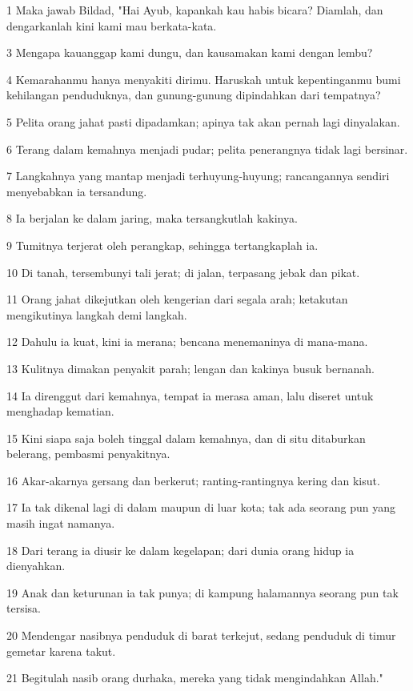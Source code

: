 \par 1 Maka jawab Bildad, "Hai Ayub, kapankah kau habis bicara? Diamlah, dan dengarkanlah kini kami mau berkata-kata.
\par 3 Mengapa kauanggap kami dungu, dan kausamakan kami dengan lembu?
\par 4 Kemarahanmu hanya menyakiti dirimu. Haruskah untuk kepentinganmu bumi kehilangan penduduknya, dan gunung-gunung dipindahkan dari tempatnya?
\par 5 Pelita orang jahat pasti dipadamkan; apinya tak akan pernah lagi dinyalakan.
\par 6 Terang dalam kemahnya menjadi pudar; pelita penerangnya tidak lagi bersinar.
\par 7 Langkahnya yang mantap menjadi terhuyung-huyung; rancangannya sendiri menyebabkan ia tersandung.
\par 8 Ia berjalan ke dalam jaring, maka tersangkutlah kakinya.
\par 9 Tumitnya terjerat oleh perangkap, sehingga tertangkaplah ia.
\par 10 Di tanah, tersembunyi tali jerat; di jalan, terpasang jebak dan pikat.
\par 11 Orang jahat dikejutkan oleh kengerian dari segala arah; ketakutan mengikutinya langkah demi langkah.
\par 12 Dahulu ia kuat, kini ia merana; bencana menemaninya di mana-mana.
\par 13 Kulitnya dimakan penyakit parah; lengan dan kakinya busuk bernanah.
\par 14 Ia direnggut dari kemahnya, tempat ia merasa aman, lalu diseret untuk menghadap kematian.
\par 15 Kini siapa saja boleh tinggal dalam kemahnya, dan di situ ditaburkan belerang, pembasmi penyakitnya.
\par 16 Akar-akarnya gersang dan berkerut; ranting-rantingnya kering dan kisut.
\par 17 Ia tak dikenal lagi di dalam maupun di luar kota; tak ada seorang pun yang masih ingat namanya.
\par 18 Dari terang ia diusir ke dalam kegelapan; dari dunia orang hidup ia dienyahkan.
\par 19 Anak dan keturunan ia tak punya; di kampung halamannya seorang pun tak tersisa.
\par 20 Mendengar nasibnya penduduk di barat terkejut, sedang penduduk di timur gemetar karena takut.
\par 21 Begitulah nasib orang durhaka, mereka yang tidak mengindahkan Allah."

